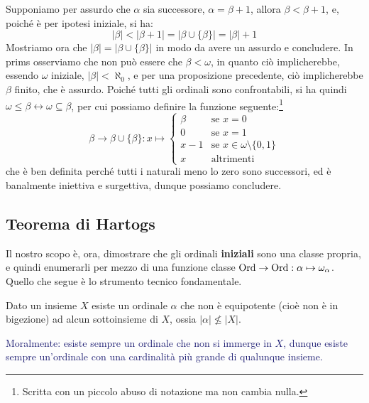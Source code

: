 \begin{soln}
	Supponiamo per assurdo che $\alpha$ sia successore, $\alpha = \beta + 1$, allora $\beta < \beta + 1$, e, poiché è per ipotesi iniziale, si ha:
	\[ |\beta| < |\beta + 1| = |\beta \cup \{\beta\}| = |\beta| + 1
		\]
	Mostriamo ora che $|\beta| = |\beta \cup \{\beta\}|$ in modo da avere un assurdo e concludere. In prims osserviamo che non può essere che $\beta < \omega$, in quanto ciò implicherebbe, essendo $\omega$ iniziale, $|\beta| < \aleph_0$, e per una proposizione precedente,
	ciò implicherebbe $\beta$ finito, che è assurdo. Poiché tutti gli ordinali sono confrontabili, si ha quindi $\omega \leq \beta \leftrightarrow \omega \subseteq \beta$, per cui possiamo definire la funzione seguente:\footnote{Scritta con un piccolo abuso di notazione ma non cambia nulla.}
	\[ \beta \to \beta \cup \{\beta\} : x \mapsto \begin{cases}
		\beta &\text{se $x = 0$}\\
		0 &\text{se $x = 1$}\\
		x-1 &\text{se $x \in \omega \setminus\{0,1\}$}\\
		x &\text{altrimenti}
	\end{cases}
		\]
	che è ben definita perché tutti i naturali meno lo zero sono successori, ed è banalmente iniettiva e surgettiva, dunque possiamo concludere.
\end{soln}

\subsection{Teorema di Hartogs}
Il nostro scopo è, ora, dimostrare che gli ordinali \textbf{iniziali} sono una classe propria, e quindi enumerarli per mezzo di una funzione classe $\operatorname{Ord} \rightarrow \operatorname{Ord} : \alpha \mapsto \omega_\alpha$.
Quello che segue è lo strumento tecnico fondamentale.

\begin{theorem}
	Dato un insieme $X$ esiste un ordinale $\alpha$ che non è equipotente (cioè non è in bigezione) ad alcun sottoinsieme di $X$, ossia $|\alpha| \not\leq |X|$.
\end{theorem}

\textcolor{MidnightBlue}{Moralmente: esiste sempre un ordinale che non si immerge in $X$, dunque esiste sempre un'ordinale con una cardinalità più grande di qualunque insieme.}

